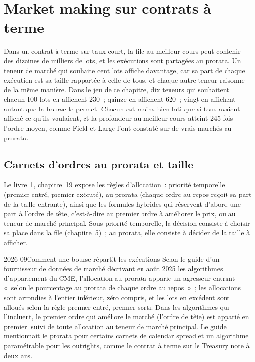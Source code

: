 \chapter{Market making sur contrats à terme}\label{ch:hf:futures-market-making}

Dans un contrat à terme sur taux court, la file au meilleur cours peut contenir des dizaines de milliers de lots, et les exécutions sont partagées au prorata. Un teneur de marché qui
souhaite cent lots affiche davantage, car sa part de chaque exécution est sa taille rapportée à celle de tous, et chaque autre teneur raisonne de la même manière. Dans le
jeu de ce chapitre, dix teneurs qui souhaitent chacun 100 lots en affichent 230~; quinze en affichent 620~; vingt en affichent autant que la bourse le permet. Chacun est moins bien loti que si
tous avaient affiché ce qu'ils voulaient, et la profondeur au meilleur cours atteint 245 fois l'ordre moyen, comme Field et Large l'ont constaté sur de vrais
marchés au prorata.

\section{Carnets d'ordres au prorata et taille}

Le livre~1, chapitre~19 expose les règles d'allocation~: priorité temporelle (premier entré, premier exécuté), au prorata (chaque ordre au repos reçoit sa part de la
taille entrante), ainsi que les formules hybrides qui réservent d'abord une part à l'ordre de tête, c'est-à-dire au premier ordre à améliorer le prix, ou au teneur de marché principal. Sous priorité temporelle, la
décision consiste à choisir sa place dans la file (chapitre~5)~; au prorata, elle consiste à décider de la taille à afficher.

\begin{dated}{2026-09}{Comment une bourse répartit les exécutions}\label{dat:hf:futures-market-making:cme}
Selon le guide d'un fournisseur de données de marché décrivant en août 2025 les algorithmes d'appariement du CME, l'allocation au prorata apparie un agresseur entrant «~selon
le pourcentage au prorata de chaque ordre au repos~»~; les allocations sont arrondies à l'entier inférieur, zéro compris, et les lots en excédent sont
alloués selon la règle premier entré, premier sorti. Dans les algorithmes qui l'incluent, le premier ordre qui améliore le marché (l'ordre de tête) est apparié en premier, suivi de toute
allocation au teneur de marché principal. Le guide mentionnait le prorata pour certains carnets de calendar spread et un algorithme paramétrable pour les outrights, comme le
contrat à terme sur le Treasury note à deux ans.
\end{dated}

